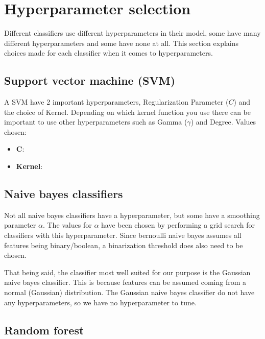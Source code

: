 \section{Hyperparameter selection}

Different classifiers use different hyperparameters in their model, some have many different hyperparameters and some have none at all. This section explains choices made for each classifier when it comes to hyperparameters.

\subsection{Support vector machine (SVM)}
A SVM have 2 important hyperparameters, Regularization Parameter (\(C\)) and the choice of Kernel.
Depending on which kernel function you use there can be important to use other hyperparameters such as Gamma (\(\gamma\)) and Degree.
Values chosen:
\begin{itemize}
    \item \textbf{\(\boldsymbol{C}\)}:
    \item \textbf{Kernel}:
\end{itemize}

\subsection{Naive bayes classifiers}
Not all naive bayes classifiers have a hyperparameter, but some have a smoothing parameter $\alpha$. The values for $\alpha$ have been chosen by performing a grid search for classifiers with this hyperparameter. Since bernoulli naive bayes assumes all features being binary/boolean, a binarization threshold does also need to be chosen. 
\par
That being said, the classifier most well suited for our purpose is the Gaussian naive bayes classifier. This is because features can be assumed coming from a normal (Gaussian) distribution. The Gaussian naive bayes classifier do not have any hyperparameters, so we have no hyperparameter to tune. 

\subsection{Random forest}
